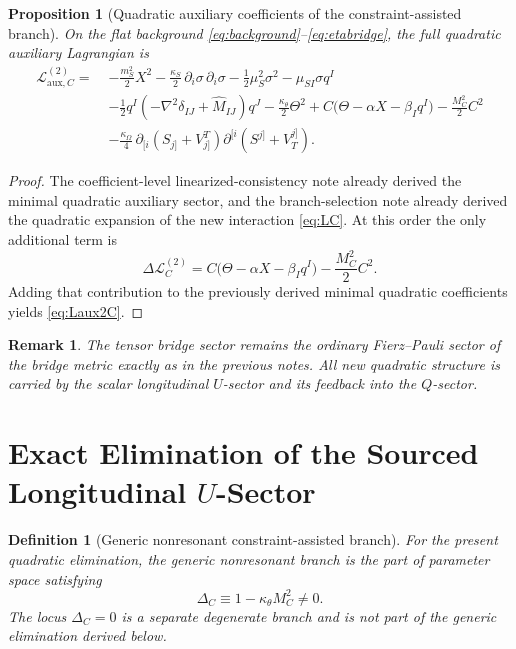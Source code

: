 \documentclass[11pt]{article}
\newtheorem{definition}{Definition}
\newtheorem{proposition}{Proposition}
\newtheorem{remark}{Remark}
\begin{document}
\begin{proposition}[Quadratic auxiliary coefficients of the constraint-assisted branch]
On the flat background \eqref{eq:background}--\eqref{eq:etabridge}, the full quadratic auxiliary Lagrangian is
\begin{align}
\mathcal L_{\mathrm{aux},C}^{(2)}
=\;&
-\frac{m_S^2}{2}X^2
-\frac{\kappa_S}{2}\,\partial_i\sigma\,\partial_i\sigma
-\frac{1}{2}\mu_S^2\sigma^2
-\mu_{SI}\sigma q^I
\nonumber\\
&-\frac{1}{2}q^I\!\left(-\nabla^2\delta_{IJ}+\widehat M_{IJ}\right)\!q^J
-\frac{\kappa_\theta}{2}\Theta^2
+C\bigl(\Theta-\alpha X-\beta_Iq^I\bigr)
-\frac{M_C^2}{2}C^2
\nonumber\\
&-\frac{\kappa_\Omega}{4}\,
\partial_{[i}\!\left(S_{j]}+V^T_{j]}\right)
\partial^{[i}\!\left(S^{j]}+V_T^{j]}\right).
\label{eq:Laux2C}
\end{align}
\end{proposition}

\begin{proof}
The coefficient-level linearized-consistency note already derived the minimal quadratic auxiliary sector, and the branch-selection note already derived the quadratic expansion of the new interaction \eqref{eq:LC}. At this order the only additional term is
\[
\Delta\mathcal L_C^{(2)}
=
C\bigl(\Theta-\alpha X-\beta_Iq^I\bigr)
-\frac{M_C^2}{2}C^2.
\]
Adding that contribution to the previously derived minimal quadratic coefficients yields \eqref{eq:Laux2C}.
\end{proof}

\begin{remark}
The tensor bridge sector remains the ordinary Fierz--Pauli sector of the bridge metric exactly as in the previous notes. All new quadratic structure is carried by the scalar longitudinal \(U\)-sector and its feedback into the \(Q\)-sector.
\end{remark}

\section{Exact Elimination of the Sourced Longitudinal \texorpdfstring{\(U\)}{U}-Sector}

\begin{definition}[Generic nonresonant constraint-assisted branch]
For the present quadratic elimination, the generic nonresonant branch is the part of parameter space satisfying
\begin{equation}
\Delta_C\equiv 1-\kappa_\theta M_C^2\neq 0.
\label{eq:DeltaC}
\end{equation}
The locus \(\Delta_C=0\) is a separate degenerate branch and is not part of the generic elimination derived below.
\end{definition}
\end{document}
